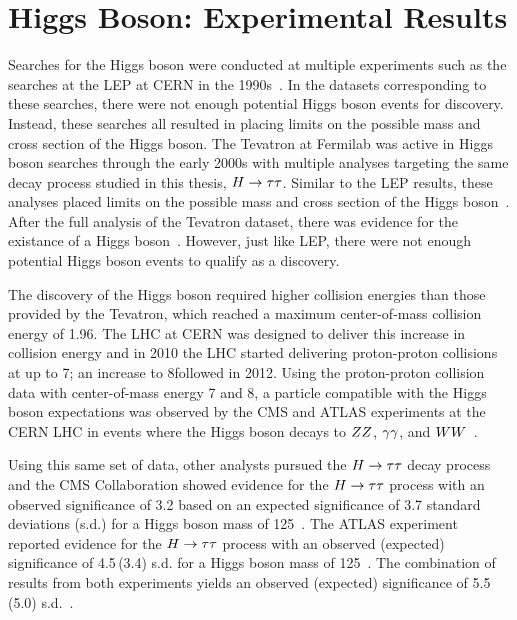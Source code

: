 \section{Higgs Boson: Experimental Results}
Searches for the Higgs boson were conducted at multiple experiments such as the searches
at the LEP at CERN in the 1990s~\cite{Barate:2000ts,Abdallah:2003ip,Achard:2001pj,Abbiendi:2000ac}.
In the datasets corresponding to these searches, there were not enough potential Higgs
boson events for discovery.
Instead, these searches all resulted in placing limits on the possible mass and cross section
of the Higgs boson. The Tevatron at Fermilab was active in Higgs boson searches through the early 2000s
with multiple analyses targeting the same decay process studied in this thesis, $H\to\tau\tau$. 
Similar to the LEP results, these analyses
placed limits on the possible mass and cross section of the Higgs boson~\cite{Aaltonen:2012jh, Abazov:2012zj}.
After the full analysis of the Tevatron dataset, there was evidence for the existance of a Higgs 
boson~\cite{PhysRevD.88.052014, PhysRevLett.109.071804}. However,
just like LEP, there were not enough potential Higgs boson events to qualify as a discovery.

The discovery of the Higgs boson required higher collision energies than those provided
by the Tevatron, which reached a maximum center-of-mass collision energy of 1.96\TeV. The
LHC at CERN was designed to deliver this increase in collision energy and in 2010 the LHC started
delivering proton-proton collisions at up to 7\TeV; an increase to 8\TeV followed in 2012.
Using the proton-proton collision data with center-of-mass energy 7 and 8\TeV,
a particle compatible with the Higgs boson expectations was observed by the CMS and ATLAS experiments at the CERN LHC
in events where the Higgs boson decays to $ZZ$, $\gamma\gamma$, and 
$WW$~\cite{Aad:2012tfa, Chatrchyan:2012xdj, Chatrchyan:2013lba}.

Using this same set of data, other analysts pursued the $H\to\tau\tau$ decay process and
the CMS Collaboration showed evidence for the $H\to\tau\tau$ process with an observed
significance of 3.2 based on an expected significance of 3.7 standard deviations (s.d.)
for a Higgs boson mass of 125\GeV~\cite{Chatrchyan:2014nva}.
The ATLAS experiment reported evidence for the $H\to\tau\tau$ process 
with an observed (expected) significance of 4.5\,(3.4)
s.d. for a Higgs boson mass of 125\GeV~\cite{Aad:2015vsa}.
The combination of results from both experiments yields an observed (expected)
significance of 5.5\,(5.0) s.d.~\cite{Khachatryan:2016vau}.


